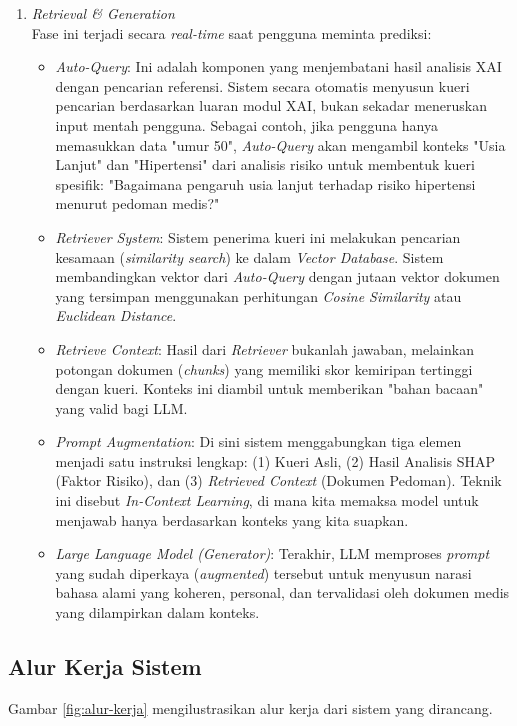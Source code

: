 \begin{enumerate}
\begin{enumerate}[label=\Alph*.]
        \item \textit{Retrieval \& Generation} \\
        Fase ini terjadi secara \textit{real-time} saat pengguna meminta prediksi:
        \begin{itemize}
            \item \textit{Auto-Query}: Ini adalah komponen yang menjembatani hasil analisis XAI dengan pencarian referensi. Sistem secara otomatis menyusun kueri pencarian berdasarkan luaran modul XAI, bukan sekadar meneruskan input mentah pengguna. Sebagai contoh, jika pengguna hanya memasukkan data "umur 50", \textit{Auto-Query} akan mengambil konteks "Usia Lanjut" dan "Hipertensi" dari analisis risiko untuk membentuk kueri spesifik: "Bagaimana pengaruh usia lanjut terhadap risiko hipertensi menurut pedoman medis?"
            \item \textit{Retriever System}: Sistem penerima kueri ini melakukan pencarian kesamaan (\textit{similarity search}) ke dalam \textit{Vector Database}. Sistem membandingkan vektor dari \textit{Auto-Query} dengan jutaan vektor dokumen yang tersimpan menggunakan perhitungan \textit{Cosine Similarity} atau \textit{Euclidean Distance}.
            \item \textit{Retrieve Context}: Hasil dari \textit{Retriever} bukanlah jawaban, melainkan potongan dokumen (\textit{chunks}) yang memiliki skor kemiripan tertinggi dengan kueri. Konteks ini diambil untuk memberikan "bahan bacaan" yang valid bagi LLM.
            \item \textit{Prompt Augmentation}: Di sini sistem menggabungkan tiga elemen menjadi satu instruksi lengkap: (1) Kueri Asli, (2) Hasil Analisis SHAP (Faktor Risiko), dan (3) \textit{Retrieved Context} (Dokumen Pedoman). Teknik ini disebut \textit{In-Context Learning}, di mana kita memaksa model untuk menjawab hanya berdasarkan konteks yang kita suapkan.
            \item \textit{Large Language Model (Generator)}: Terakhir, LLM memproses \textit{prompt} yang sudah diperkaya (\textit{augmented}) tersebut untuk menyusun narasi bahasa alami yang koheren, personal, dan tervalidasi oleh dokumen medis yang dilampirkan dalam konteks.
        \end{itemize}
    \end{enumerate}
\end{enumerate}
\subsection{Alur Kerja Sistem}
Gambar \ref{fig:alur-kerja} mengilustrasikan alur kerja dari sistem yang dirancang.

